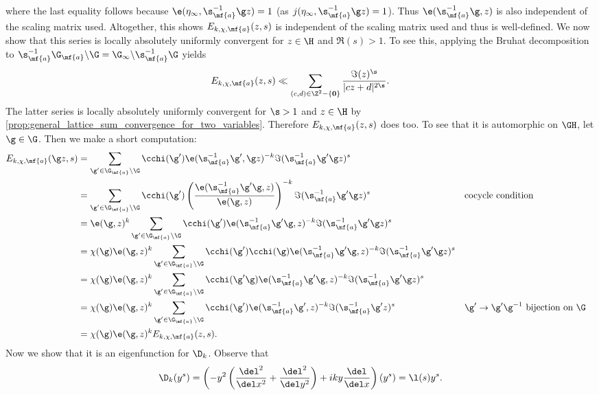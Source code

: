     where the last equality follows because $\e(\eta_{\infty},\s_{\mf{a}}^{-1}\g z) = 1$ (as $j(\eta_{\infty},\s_{\mf{a}}^{-1}\g z) = 1$). Thus $\e(\s_{\mf{a}}^{-1}\g,z)$ is also independent of the scaling matrix used. Altogether, this shows $E_{k,\chi,\mf{a}}(z,s)$ is independent of the scaling matrix used and thus is well-defined. We now show that this series is locally absolutely uniformly convergent for $z \in \H$ and $\Re(s) > 1$. To see this, applying the Bruhat decomposition to $\s_{\mf{a}}^{-1}\G_{\mf{a}}\backslash\G = \G_{\infty}\backslash\s_{\mf{a}}^{-1}\G$ yields
    \[
      E_{k,\chi,\mf{a}}(z,s) \ll \sum_{(c,d) \in \Z^{2}-\{\mathbf{0}\}}\frac{\Im(z)^{\s}}{|cz+d|^{2\s}}.
    \]
    The latter series is locally absolutely uniformly convergent for $\s > 1$ and $z \in \H$ by \cref{prop:general_lattice_sum_convergence_for_two_variables}. Therefore $E_{k,\chi,\mf{a}}(z,s)$ does too. To see that it is automorphic on $\GH$, let $\g \in \G$. Then we make a short computation:
    \begin{align*}
      E_{k,\chi,\mf{a}}(\g z,s) &= \sum_{\g' \in \G_{\mf{a}}\backslash\G}\cchi(\g')\e(\s_{\mf{a}}^{-1}\g',\g z)^{-k}\Im(\s_{\mf{a}}^{-1}\g'\g z)^{s} \\
      &= \sum_{\g' \in \G_{\mf{a}}\backslash\G}\cchi(\g')\left(\frac{\e(\s_{\mf{a}}^{-1}\g'\g,z)}{\e(\g,z)}\right)^{-k}\Im(\s_{\mf{a}}^{-1}\g'\g z)^{s} && \text{cocycle condition} \\
      &= \e(\g,z)^{k}\sum_{\g' \in \G_{\mf{a}}\backslash\G}\cchi(\g')\e(\s_{\mf{a}}^{-1}\g'\g,z)^{-k}\Im(\s_{\mf{a}}^{-1}\g'\g z)^{s} \\
      &= \chi(\g)\e(\g,z)^{k}\sum_{\g' \in \G_{\mf{a}}\backslash\G}\cchi(\g')\cchi(\g)\e(\s_{\mf{a}}^{-1}\g'\g,z)^{-k}\Im(\s_{\mf{a}}^{-1}\g'\g z)^{s} \\
      &= \chi(\g)\e(\g,z)^{k}\sum_{\g' \in \G_{\mf{a}}\backslash\G}\cchi(\g'\g)\e(\s_{\mf{a}}^{-1}\g'\g,z)^{-k}\Im(\s_{\mf{a}}^{-1}\g'\g z)^{s} \\
      &= \chi(\g)\e(\g,z)^{k}\sum_{\g' \in \G_{\mf{a}}\backslash\G}\cchi(\g')\e(\s_{\mf{a}}^{-1}\g',z)^{-k}\Im(\s_{\mf{a}}^{-1}\g' z)^{s} && \text{$\g' \to \g'\g^{-1}$ bijection on $\G$} \\
      &= \chi(\g)\e(\g,z)^{k}E_{k,\chi,\mf{a}}(z,s).
    \end{align*}
    Now we show that it is an eigenfunction for $\D_{k}$. Observe that
    \[
      \D_{k}(y^{s}) = \left(-y^{2}\left(\frac{\del^{2}}{\del x^{2}}+\frac{\del^{2}}{\del y^{2}}\right)+iky\frac{\del}{\del x}\right)(y^{s}) = \l(s)y^{s}.
    \]
